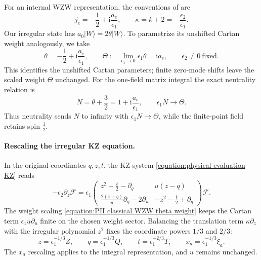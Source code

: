 \documentclass[a4paper,11pt]{article}
\newcommand{\cF}{\mathcal{F}}
\numberwithin{equation}{section}
\begin{document}
For an internal WZW representation, the conventions of
\cite[Eq.~(D.2)]{FrenkelGukovTeschner2015} are
\begin{equation}
	j_{e}=-\frac{1}{2}+\mathrm{i}\frac{a_{e}}{\epsilon_{1}},
	\qquad
	\kappa=k+2=-\frac{\epsilon_{2}}{\epsilon_{1}}.
\end{equation}
Our irregular state has $a_{0}|W\rangle=2\theta|W\rangle$.
To parametrize its unshifted Cartan weight analogously, we take
\begin{equation}
	\label{equation:PII classical WZW theta weight}
	\theta=-\frac{1}{2}+\mathrm{i}\frac{a_{e}}{\epsilon_{1}},
	\qquad
	\Theta:=\lim_{\epsilon_{1}\to0}\epsilon_{1}\theta=\mathrm{i}a_{e},
	\qquad \epsilon_{2}\ne0\ \text{fixed}.
\end{equation}
This identifies the unshifted Cartan parameters; finite zero-mode shifts
leave the scaled weight $\Theta$ unchanged.
For the one-field matrix integral the exact neutrality relation is
\begin{equation}
	\label{equation:PII classical WZW neutrality}
	N=\theta+\frac{3}{2}
	=1+\mathrm{i}\frac{a_{e}}{\epsilon_{1}},
	\qquad \epsilon_{1}N\longrightarrow\Theta.
\end{equation}
Thus neutrality sends $N$ to infinity with
$\epsilon_{1}N\longrightarrow\Theta$, while the finite-point field
retains spin $\frac{1}{2}$.

\paragraph*{Rescaling the irregular KZ equation.}

In the original coordinates $q,z,t$, the KZ system
\eqref{equation:physical evaluation KZ} reads
\begin{equation}
	-\epsilon_{2}\partial_{z}\cF
	=\epsilon_{1}
	\begin{pmatrix}
		z^{2}+\frac{t}{2}-\partial_{q} & u(z-q)\\[1mm]
		\frac{2(z+q)}{u}\partial_{q}-2\partial_{u}&
		-z^{2}-\frac{t}{2}+\partial_{q}
	\end{pmatrix}\cF.
\end{equation}
The weight scaling \eqref{equation:PII classical WZW theta weight}
keeps the Cartan term $\epsilon_{1}u\partial_{u}$ finite on the
chosen weight sector.  Balancing the translation term
$\kappa\partial_{z}$ with the irregular polynomial $z^{2}$ fixes
the coordinate powers $1/3$ and $2/3$:
\begin{equation}
	\label{equation:PII classical WZW cubic balance}
	z=\epsilon_{1}^{-1/3}Z,\qquad
	q=\epsilon_{1}^{-1/3}Q,\qquad
	t=\epsilon_{1}^{-2/3}T,\qquad
	x_{a}=\epsilon_{1}^{-1/3}\xi_{a}.
\end{equation}
The $x_{a}$ rescaling applies to the integral representation, and $u$
remains unchanged.
\end{document}
